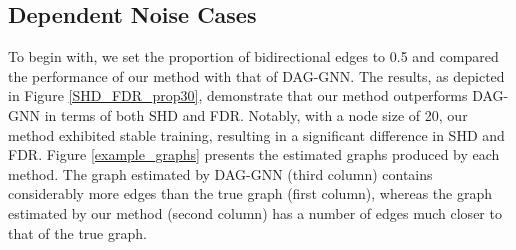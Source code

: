 \documentclass[10pt]{article}
\begin{document}
\subsection{Dependent Noise Cases}

To begin with, we set the proportion of bidirectional edges to 0.5 and compared the performance of our method with that of DAG-GNN. The results, as depicted in Figure \ref*{SHD_FDR_prop30}, demonstrate that our method outperforms DAG-GNN in terms of both SHD and FDR. Notably, with a node size of 20, our method exhibited stable training, resulting in a significant difference in SHD and FDR. Figure \ref*{example_graphs} presents the estimated graphs produced by each method. The graph estimated by DAG-GNN (third column) contains considerably more edges than the true graph (first column), whereas the graph estimated by our method (second column) has a number of edges much closer to that of the true graph.\\
\end{document}
